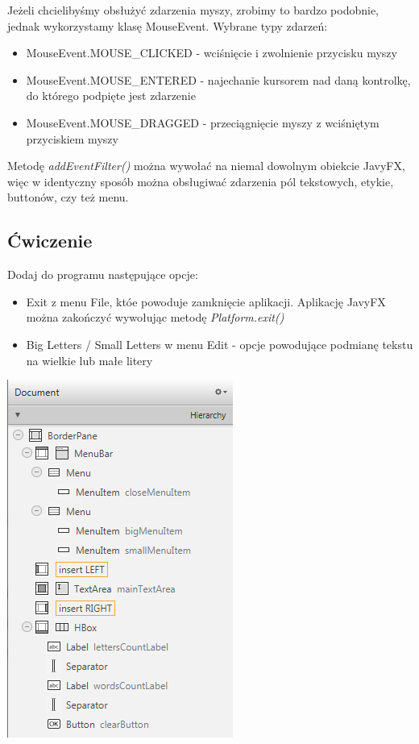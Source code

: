 \documentclass[letterpaper,10pt,english]{sphinxmanual}
\begin{document}
Jeżeli chcielibyśmy obsłużyć zdarzenia myszy, zrobimy to bardzo podobnie, jednak wykorzystamy klasę MouseEvent. Wybrane typy zdarzeń:
\begin{itemize}
\item {} 
MouseEvent.MOUSE\_CLICKED - wciśnięcie i zwolnienie przycisku myszy

\item {} 
MouseEvent.MOUSE\_ENTERED - najechanie kursorem nad daną kontrolkę, do którego podpięte jest zdarzenie

\item {} 
MouseEvent.MOUSE\_DRAGGED - przeciągnięcie myszy z wciśniętym przyciskiem myszy

\end{itemize}

Metodę \emph{addEventFilter()} można wywołać na niemal dowolnym obiekcie JavyFX, więc w identyczny sposób można obsługiwać zdarzenia pól tekstowych, etykie, buttonów, czy też menu.


\subsection{Ćwiczenie}
\label{gui2:cwiczenie}
Dodaj do programu następujące opcje:
\begin{itemize}
\item {} 
Exit z menu File, któe powoduje zamknięcie aplikacji. Aplikację JavyFX można zakończyć wywołując metodę \emph{Platform.exit()}

\item {} 
Big Letters / Small Letters w menu Edit - opcje powodujące podmianę tekstu na wielkie lub małe litery

\end{itemize}

{\hfill\includegraphics{zad1.png}\hfill}
\end{document}
